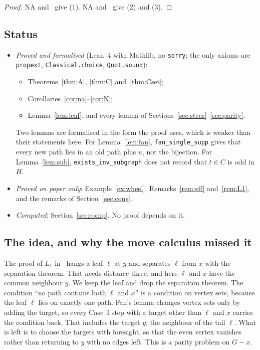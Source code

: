 \documentclass[11pt]{amsart}
\theoremstyle{definition}
\begin{document}
\begin{proof}
NA and~\cite[Lemma~4.4]{CN} give (1). NA and~\cite[Theorem~4.6, Corollary~4.7]{CN} give (2) and (3).
\end{proof}

\subsection*{Status}
\begin{itemize}
\item \emph{Proved and formalised} (Lean~4 with Mathlib, no \texttt{sorry}; the only axioms are
\texttt{propext}, \texttt{Classical.choice}, \texttt{Quot.sound}):
  \begin{itemize}
  \item Theorems~\ref{thm:A}, \ref{thm:C} and~\ref{thm:Cset};
  \item Corollaries~\ref{cor:na}--\ref{cor:N};
  \item Lemma~\ref{lem:leaf}, and every lemma of Sections~\ref{sec:steer}--\ref{sec:parity}.
  \end{itemize}
  Two lemmas are formalised in the form the proof uses, which is weaker than their statements here.
  For Lemma~\ref{lem:fan}, \texttt{fan\_single\_supp} gives that every new path lies in an old path
  plus $u$, not the bijection. For Lemma~\ref{lem:sub}, \texttt{exists\_inv\_subgraph} does not
  record that $t\in C$ is odd in $H$.
\item \emph{Proved on paper only}: Example~\ref{ex:wheel}, Remarks~\ref{rem:eff} and~\ref{rem:L1},
and the remarks of Section~\ref{sec:cons}.
\item \emph{Computed}: Section~\ref{sec:comp}. No proof depends on it.
\end{itemize}

\subsection*{The idea, and why the move calculus missed it}
The proof of $L_1$ in~\cite{RD} hangs a leaf $\ell$ at $y$ and separates $\ell$ from $x$ with the
separation theorem. That needs distance three, and here $\ell$ and $x$ have the common neighbour $y$.
We keep the leaf and drop the separation theorem. The condition ``no path contains both $\ell$ and $x$''
is a condition on vertex sets, because the leaf $\ell$ lies on exactly one path. Fan's lemma changes
vertex sets only by adding the target, so every Case~I step with a target other than $\ell$ and $x$
carries the condition back. That includes the target $y$, the neighbour of the tail $\ell$. What is
left is to choose the targets with foresight, so that the even vertex vanishes rather than returning
to $y$ with no edges left. This is a parity problem on $G-x$.
\end{document}
